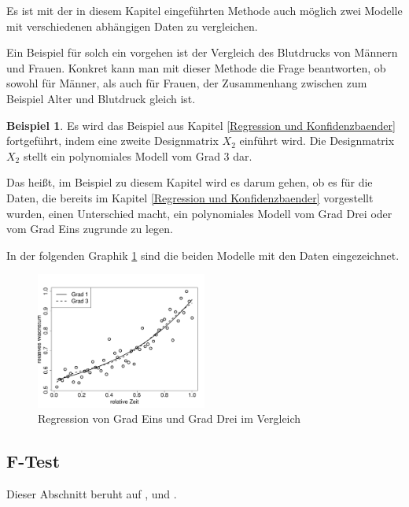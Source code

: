 \documentclass[12pt,a4paper]{article}
\theoremstyle{definition}
\newtheorem{Beispiel}[Definition]{Beispiel}
\theoremstyle{definition}
\theoremstyle{definition}
\theoremstyle{definition}
\newcommand{\betatwodat}[0]{\left[ \begin{array}{c} \beta_{0,2} \\ \beta_{1,2} \\ \beta_{1,3} \\ \beta_{1,4} \end{array} \right]}
\newcommand{\betaonedat}[0]{\left[ \begin{array}{c} \beta_{0,1} \\ \beta_{1,1} \end{array} \right]}
\begin{document}
Es ist mit der in diesem Kapitel eingeführten Methode auch möglich zwei Modelle mit verschiedenen abhängigen Daten zu vergleichen. 

Ein Beispiel für solch ein vorgehen ist der Vergleich des Blutdrucks von Männern und Frauen. Konkret kann man mit dieser Methode die Frage beantworten, ob sowohl für Männer, als auch für Frauen, der Zusammenhang zwischen zum Beispiel Alter und Blutdruck gleich ist.

\begin{Beispiel}
Es wird das Beispiel aus Kapitel \ref{Regression und Konfidenzbaender} fortgeführt, indem eine zweite Designmatrix $X_2$ einführt wird. Die Designmatrix $X_2$ stellt ein polynomiales Modell vom Grad 3 dar. 

Das heißt, im Beispiel zu diesem Kapitel wird es darum gehen, ob es für die Daten, die bereits im Kapitel \ref{Regression und Konfidenzbaender} vorgestellt wurden, einen Unterschied macht, ein polynomiales Modell vom Grad Drei oder vom Grad Eins zugrunde zu legen. 

In der folgenden Graphik \ref{Vergleich-Bsp} sind die beiden Modelle mit den Daten eingezeichnet.

\begin{figure}[H] 
  \centering
     \includegraphics[width=0.5\textwidth]{Bsp-beide-in-einem-plot}
  \caption{Regression von Grad Eins und Grad Drei im Vergleich}
  \label{Vergleich-Bsp}
\end{figure}

%
\end{Beispiel}




\subsection{F-Test}
\label{Vergleich F-Test}
Dieser Abschnitt beruht auf \cite[9-15]{Liu64} ,\cite[114-115]{Liu64} und \cite{Draper98}.
\end{document}
